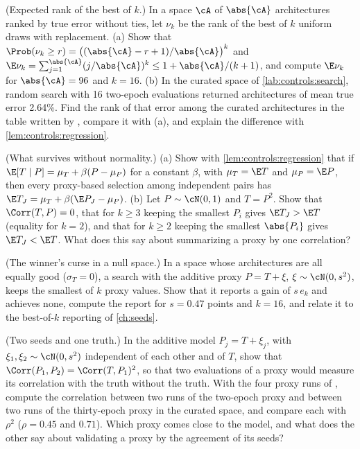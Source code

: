 \begin{refsection}
\begin{exercises}
\item \consolidation (Expected rank of the best of $k$.) In a space $\cA$ of $\abs{\cA}$ architectures ranked by true error without ties, let $\nu_k$ be the rank of the best of $k$ uniform draws with replacement. (a) Show that $\Prob(\nu_k\ge r)=\bigl((\abs{\cA}-r+1)/\abs{\cA}\bigr)^k$ and $\E\nu_k=\sum_{j=1}^{\abs{\cA}}(j/\abs{\cA})^k\le1+\abs{\cA}/(k+1)$, and compute $\E\nu_k$ for $\abs{\cA}=96$ and $k=16$. (b) In the curated space of \cref{lab:controls:search}, random search with 16 two-epoch evaluations returned architectures of mean true error 2.64\%. Find the rank of that error among the curated architectures in the table written by , compare it with (a), and explain the difference with \cref{lem:controls:regression}.\label{ex:controls:rank}

\item \consolidation\hard (What survives without normality.) (a) Show with \cref{lem:controls:regression} that if $\E[T\mid P]=\mu_T+\beta(P-\mu_P)$ for a constant $\beta$, with $\mu_T=\E T$ and $\mu_P=\E P$, then every proxy-based selection among independent pairs has $\E T_J=\mu_T+\beta(\E P_J-\mu_P)$. (b) Let $P\sim\cN(0,1)$ and $T=P^2$. Show that $\Corr(T,P)=0$, that for $k\ge3$ keeping the smallest $P_i$ gives $\E T_J>\E T$ (equality for $k=2$), and that for $k\ge2$ keeping the smallest $\abs{P_i}$ gives $\E T_J<\E T$. What does this say about summarizing a proxy by one correlation? \label{ex:controls:nonnormal}

\item \consolidation (The winner's curse in a null space.) In a space whose architectures are all equally good ($\sigma_T=0$), a search with the additive proxy $P=T+\xi$, $\xi\sim\cN(0,s^2)$, keeps the smallest of $k$ proxy values. Show that it reports a gain of $s\,e_k$ and achieves none, compute the report for $s=0.47$ points and $k=16$, and relate it to the best-of-$k$ reporting of \cref{ch:seeds}.\label{ex:controls:null}

\item \consolidation\hard (Two seeds and one truth.) In the additive model $P_j=T+\xi_j$, with $\xi_1,\xi_2\sim\cN(0,s^2)$ independent of each other and of $T$, show that $\Corr(P_1,P_2)=\Corr(T,P_1)^2$, so that two evaluations of a proxy would measure its correlation with the truth without the truth. With the four proxy runs of , compute the correlation between two runs of the two-epoch proxy and between two runs of the thirty-epoch proxy in the curated space, and compare each with $\rho^2$ ($\rho=0.45$ and $0.71$). Which proxy comes close to the model, and what does the other say about validating a proxy by the agreement of its seeds? \label{ex:controls:twoseeds}


\end{exercises}
\end{refsection}

